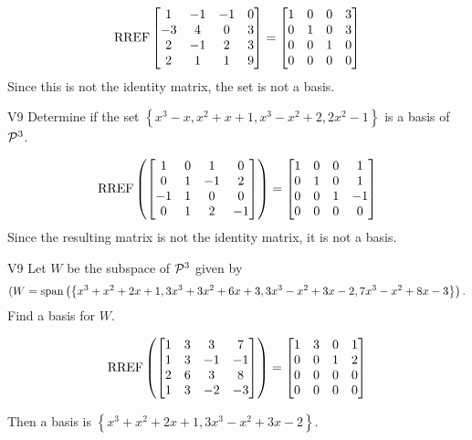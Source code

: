 \begin{solution}
\[\RREF \begin{bmatrix} 1 & -1 & -1 & 0 \\ -3 & 4 & 0 & 3 \\ 2 & -1 & 2 & 3 \\ 2 & 1 & 1 & 9 \end{bmatrix}=\begin{bmatrix} 1 &0 & 0 & 3 \\ 0 & 1 & 0 & 3 \\ 0 & 0 & 1 & 0 \\ 0 & 0 & 0 & 0 \end{bmatrix}\]
Since this is not the identity matrix, the set is not a basis.
\end{solution}


\begin{problem}{V9}
Determine if the set \(\left\{ x^3-x, x^2+x+1, x^3-x^2+2, 2x^2-1 \right\}\) is a basis of \(\P^3\).
\end{problem}
\begin{solution}
\[\RREF\left(\begin{bmatrix} 1 & 0 & 1 & 0 \\ 0 & 1 & -1 & 2 \\ -1 & 1 & 0 & 0 \\ 0 & 1 & 2 & -1 \end{bmatrix} \right)= \begin{bmatrix} 1 & 0 &0 & 1 \\ 0 & 1 & 0 & 1 \\ 0 & 0 & 1 & -1 \\ 0 & 0 & 0 & 0 \end{bmatrix}\]
Since the resulting matrix is not the identity matrix, it is not a basis.
\end{solution}

\begin{problem}{V9}
Let \(W\) be the subspace of \(\P^3\) given by \[(W = \vspan \left( \left\{ x^3+x^2+2x+1, 3x^3+3x^2+6x+3, 3x^3-x^2+3x-2, 7x^3-x^2+8x-3 \right\} \right).\]  Find a basis for \(W\).
\end{problem}
\begin{solution}
\[\RREF\left(\begin{bmatrix} 1 & 3 & 3 & 7 \\ 1 & 3 & -1 & -1 \\ 2 & 6 & 3 & 8 \\ 1 & 3 & -2 & -3 \end{bmatrix}\right) = \begin{bmatrix} 1 & 3 & 0 & 1 \\ 0 & 0 & 1 & 2 \\ 0 & 0 & 0 & 0 \\  0 & 0 & 0 & 0 \end{bmatrix}\]

Then a basis is
\( \left\{ x^3+x^2+2x+1, 3x^3-x^2+3x-2 \right\} \).
\end{solution}


